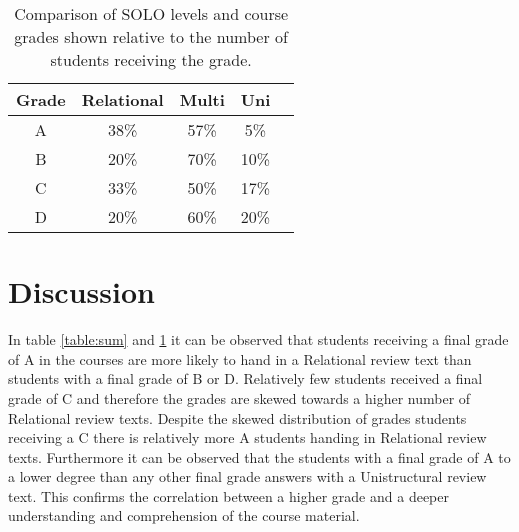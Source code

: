 \documentclass[twoside,twocolumn,a4paper,11pt,english]{article}
\begin{document}
\begin{table}[H]
\caption{Comparison of SOLO levels and course grades shown relative to the number of students receiving the grade.}
\centering
\begin{tabular}{c | c c c c}
Grade & Relational & Multi & Uni \\ [0.5ex] %
\hline
A & 38\% & 57\% & 5\% \\
B & 20\% & 70\% & 10\% \\
C & 33\% & 50\% & 17\% \\
D & 20\% & 60\% & 20\% \\ [1ex]
\end{tabular}
\label{table:percentage}
\end{table}




\section{Discussion}

In table \ref{table:sum} and \ref{table:percentage} it can be observed that students receiving a final grade of A in the courses are more likely to hand in a Relational review text than students with a final grade of B or D. Relatively few students received a final grade of C and therefore the grades are skewed towards a higher number of Relational review texts. Despite the skewed distribution of grades students receiving a C there is relatively more A students handing in Relational review texts. Furthermore it can be observed that the students with a final grade of A to a lower degree than any other final grade answers with a Unistructural review text. This confirms the correlation between a higher grade and a deeper understanding and comprehension of the course material.
\end{document}
